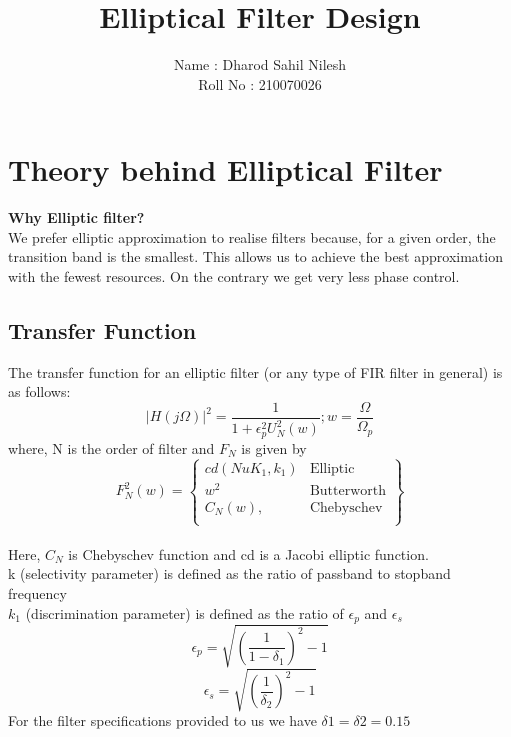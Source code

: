 \documentclass{article}
\title{Elliptical Filter Design}
\author{Name : Dharod Sahil Nilesh\\ Roll No : 210070026}
\begin{document}
\maketitle

\section{Theory behind Elliptical Filter}
\textbf{Why Elliptic filter?}\\
We prefer elliptic approximation to realise filters because, for a given order, the transition band is the smallest. This allows us to achieve the best approximation with the fewest resources. On the contrary we get very less phase control.
\subsection{Transfer Function}
The transfer function for an elliptic filter (or any type of FIR filter in general) is as follows:
\begin{equation*}
    |H(j\Omega)|^2 = \frac{1}{1+\epsilon_p^2U_N^2(w)};  w=\frac{\Omega}{\Omega_p}
\end{equation*}
where, N is the order of filter and $F_N$ is given by
\begin{equation*}
F_N^2(w)= 
\left\{
    \begin{array}{lr}
        cd(NuK_1,k_1)&\text{Elliptic}\\
        w^2 & \text{Butterworth} \\
        C_N(w), & \text{Chebyschev} \\        
    \end{array}
\right\}
\end{equation*}\\
Here,
$C_N$ is Chebyschev function and cd is a Jacobi elliptic function.\\
\hspace*{9mm} k (selectivity parameter) is defined as the ratio of passband to stopband frequency\\
\hspace*{9mm} $k_1$ (discrimination parameter) is defined as the ratio of $\epsilon_p$ and $\epsilon_s$
\begin{equation*}
    \epsilon_p = {\sqrt{(\frac{1}{1-\delta_1})^2-1}}
\end{equation*}
\begin{equation*}
    \epsilon_s = {\sqrt{(\frac{1}{\delta_2})^2-1}}
\end{equation*}
For the filter specifications provided to us we have  $\delta1=\delta2=0.15$ \\
\end{document}
